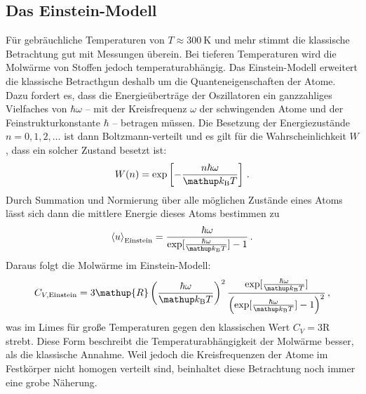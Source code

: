 \subsection{Das Einstein-Modell}
\label{subsec:einstein}
Für gebräuchliche Temperaturen von $T \approx \SI{300}{\kelvin}$ und mehr
stimmt die klassische Betrachtung gut mit Messungen überein.
Bei tieferen Temperaturen wird die Molwärme von Stoffen jedoch
temperaturabhängig.
Das Einstein-Modell erweitert die klassische Betracthgun deshalb um die
Quanteneigenschaften der Atome. Dazu fordert es, dass die Energieüberträge
der Oszillatoren ein ganzzahliges Vielfaches von $\hbar\omega$ -- mit
der Kreisfrequenz $\omega$ der schwingenden Atome und der
Feinstrukturkonstante $\hbar$ -- betragen müssen.
Die Besetzung der Energiezustände $n = 0,1,2,\dots$ ist dann Boltzmann-verteilt
und es gilt für die Wahrscheinlichkeit $W$, dass ein solcher Zustand besetzt
ist:
\begin{equation}
    \label{eqn:boltzmann}
    W(n) = \exp\left[-\frac{n\hbar\omega}{\kb T}\right]\,.
\end{equation}
Durch Summation und Normierung über alle möglichen Zustände eines Atoms
lässt sich dann die mittlere Energie dieses Atoms bestimmen zu
\begin{equation}
    \label{eqn:u_einstein}
    \left<u\right>_\text{Einstein} =
    \frac{\hbar\omega}{\exp[\frac{\hbar\omega}{\kb T}] - 1}\,.
\end{equation}
Daraus folgt die Molwärme im Einstein-Modell:
\begin{equation}
    \label{eqn:cv_einstein}
    C_{V,\text{Einstein}} =
    3\mathup{R}\left(\frac{\hbar\omega}{\kb T}\right)^2
    \frac{
        \exp[\frac{\hbar\omega}{\kb T}]
    }{
        \left(\exp[\frac{\hbar\omega}{\kb T}] - 1\right)^2
    }\,,
\end{equation}
was im Limes für große Temperaturen gegen den klassischen Wert
$C_V = 3\mathup{R}$ strebt.
Diese Form beschreibt die Temperaturabhängigkeit der Molwärme besser, als
die klassische Annahme. Weil jedoch die Kreisfrequenzen der Atome im Festkörper
nicht homogen verteilt sind, beinhaltet diese Betrachtung noch immer eine grobe
Näherung.

